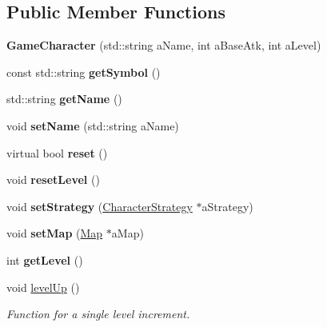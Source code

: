 \subsection*{Public Member Functions}
\begin{DoxyCompactItemize}
\item 
\hypertarget{class_game_character_a47cc5180a843cd2fe156d794fdc9ebf5}{}\label{class_game_character_a47cc5180a843cd2fe156d794fdc9ebf5} 
{\bfseries Game\+Character} (std\+::string a\+Name, int a\+Base\+Atk, int a\+Level)
\item 
\hypertarget{class_game_character_a9ba3c0844dffbe7bc597d25eabfafd73}{}\label{class_game_character_a9ba3c0844dffbe7bc597d25eabfafd73} 
const std\+::string {\bfseries get\+Symbol} ()
\item 
\hypertarget{class_game_character_a1acb3766c648348716a1b162626d6ffa}{}\label{class_game_character_a1acb3766c648348716a1b162626d6ffa} 
std\+::string {\bfseries get\+Name} ()
\item 
\hypertarget{class_game_character_af11d88fb41e0ec3f7711e18e63be62f4}{}\label{class_game_character_af11d88fb41e0ec3f7711e18e63be62f4} 
void {\bfseries set\+Name} (std\+::string a\+Name)
\item 
\hypertarget{class_game_character_ad36b2f145cd55553ded91242a9c929ce}{}\label{class_game_character_ad36b2f145cd55553ded91242a9c929ce} 
virtual bool {\bfseries reset} ()
\item 
\hypertarget{class_game_character_aa989c9d337840ce0f103dc102351b282}{}\label{class_game_character_aa989c9d337840ce0f103dc102351b282} 
void {\bfseries reset\+Level} ()
\item 
\hypertarget{class_game_character_aba3f150692940ea183b98e97f5f8e22b}{}\label{class_game_character_aba3f150692940ea183b98e97f5f8e22b} 
void {\bfseries set\+Strategy} (\hyperlink{class_character_strategy}{Character\+Strategy} $\ast$a\+Strategy)
\item 
\hypertarget{class_game_character_a839bfae2fc758ac20955df055d376e39}{}\label{class_game_character_a839bfae2fc758ac20955df055d376e39} 
void {\bfseries set\+Map} (\hyperlink{class_map}{Map} $\ast$a\+Map)
\item 
\hypertarget{class_game_character_a31aa568d3cb993da2592926d49ab5457}{}\label{class_game_character_a31aa568d3cb993da2592926d49ab5457} 
int {\bfseries get\+Level} ()
\item 
void \hyperlink{class_game_character_a367a537148a995677d9649b975cb326b}{level\+Up} ()
\begin{DoxyCompactList}\small\item\em Function for a single level increment. \end{DoxyCompactList}\item 

\end{DoxyCompactItemize}

